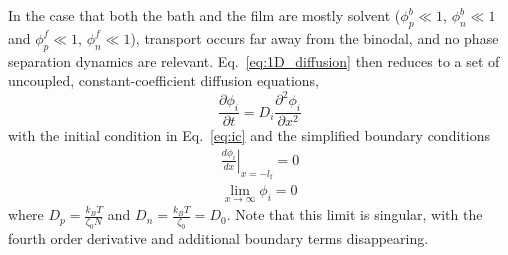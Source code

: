 \documentclass[journal=mamobx, layout=twocolumn]{achemso}
\newcommand{\txtf}{\mathrm{f}}
\begin{document}
In the case that both the bath and the film are mostly solvent ($\phi_{p}^{b} \ll 1$, $\phi_{n}^{b} \ll 1$ and $\phi_{p}^{f} \ll 1$, $\phi_{n}^{f} \ll 1$), transport occurs far away from the binodal, and no phase separation dynamics are relevant.
Eq.~\ref{eq:1D_diffusion} then reduces to a set of uncoupled, constant-coefficient diffusion equations,
\begin{equation}
\frac{\partial \phi_{i}}{\partial t} = D_{i} \frac{\partial^{2} \phi_{i}}{\partial x^{2}} \label{eq:simple_diffusion}
\end{equation}
with the initial condition in Eq.~\ref{eq:ic} and the simplified boundary conditions
\begin{gather}
\left . \frac{d \phi_{i}}{d x} \right |_{x=-l_{\txtf}} = 0 \\
\lim_{x\rightarrow\infty} \phi_{i} = 0
\end{gather}
where $D_{p} = \frac{k_{B} T}{\zeta_{0} N}$ and $D_{n} = \frac{k_{B} T}{\zeta_{0}} = D_{0}$.
Note that this limit is singular, with the fourth order derivative and additional boundary terms disappearing.
\end{document}
